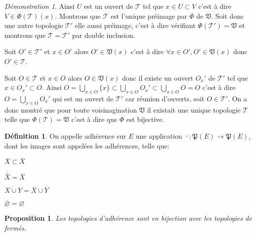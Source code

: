 \documentclass[a4paper, 11pt, french]{book}
\newenvironment{itemise}{\itemize}{\enditemize}
\theoremstyle{plain} %
\newtheorem{proposition}{Proposition}
\theoremstyle{definition} %
\newtheorem{definition}{Définition}
\theoremstyle{remark} %
\newtheorem*{demonstration}{Démonstration}
\newcommand{\1}{\mathds{1}}
\newcommand\vide{\varnothing}
\begin{document}
\begin{demonstration}
\begin{itemise}
		Ainsi $U$ est un ouvert de $\mathscr{T}$ tel que $x\in U\subset V$ c'est à dire $V\in\Phi(\mathscr{T})(x)$.
	\end{itemise}
	Montrons que $\mathscr{T}$ est l'unique préimage par $\Phi$ de $\mathfrak{V}$.
	Soit donc une autre topologie $\mathscr{T}'$ elle aussi préimage, c'est à dire vérifiant $\Phi(\mathscr{T}')=\mathfrak{V}$ et montrons que $\mathscr{T}=\mathscr{T}'$ par double inclusion.
	\begin{itemise}
		\item Soit $O'\in\mathscr{T}'$ et $x\in O'$ alors $O'\in\mathfrak{V}(x)$ c'est à dire $\forall x\in O', O'\in\mathfrak{V}(x)$ donc $O'\in\mathscr{T}$.
		\item Soit $O\in\mathscr{T}$ et $x\in O$ alors $O\in\mathfrak{V}(x)$ donc il existe un ouvert $O_x'$ de $\mathscr{T}'$ tel que $x\in O_x'\subset O$.
		Ainsi $O=\bigcup_{x\in O}\{x\}\subset\bigcup_{x\in O}O_x'\subset\bigcup_{x\in O}O=O$ c'est à dire $O=\bigcup_{x\in O}O_x'$ qui est un ouvert de $\mathscr{T}'$ car réunion d'ouverts, soit $O\in\mathscr{T}'$.
	\end{itemise}
	On a donc montré que pour toute voisinagination $\mathfrak{V}$ il existait une unique topologie $\mathscr{T}$ telle que $\Phi(\mathscr{T})=\mathfrak{V}$ c'est à dire que $\Phi$ est bijective.
\end{demonstration}

\begin{definition}
	On appelle adhérence sur $E$ une application $\overline{\cdot}\colon\mathfrak{P}(E)\rightarrow\mathfrak{P}(E)$, dont les images sont appelées les adhérences, telle que:
	\begin{itemise}
		\item $X\subset\overline{X}$
		\item $\overline{\overline{X}}=\overline{X}$
		\item $\overline{X\cup Y}=\overline{X}\cup\overline{Y}$
		\item $\overline{\vide}=\vide$
	\end{itemise}
\end{definition}

\begin{proposition}
	Les topologies d'adhérence sont en bijection avec les topologies de fermés.
\end{proposition}
\end{document}
